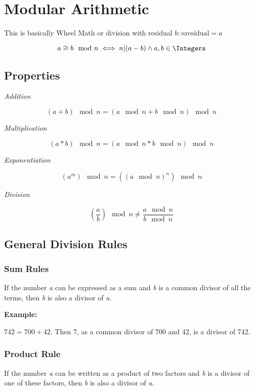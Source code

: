 \newpage
\section{Modular Arithmetic}

This is basically Wheel Math or division with residual \(b : n \text{residual} = a\)

\[
    a \cong b \mod n \iff n | (a - b) \land  a,b \in \Integers
\]

\subsection{Properties}

\emph{Addition}

\[
    (a + b) \mod n = (a \mod n + b \mod n) \mod n
\]

\emph{Multiplication}

\[
    (a * b) \mod n = (a \mod n * b \mod n) \mod n
\]

\emph{Exponentiation}

\[
    (a^m) \mod n = ({(a \mod n)}^n) \mod n
\]

\emph{Division}

\[
    (\frac{a}{b}) \mod n \ne  \frac{a \mod n}{b \mod n}
\]

\subsection{General Division Rules}

\subsubsection{Sum Rules}

If the number \emph{a} can be expressed as a sum and \emph{b} is a common divisor of all the terms, 
then \emph{b} is also a divisor of \emph{a}.
\vspace{\baselineskip}

\textbf{Example:} 
\vspace{\baselineskip}

\( 742 = 700 + 42 \). Then 7, as a common divisor of 700 and 42, is a divisor of 742.

\subsubsection{Product Rule}

If the number \emph{a} can be written as a product of two factors and \emph{b} is a divisor of one of these 
factors, then \emph{b} is also a divisor of \emph{a}.
\vspace{\baselineskip}

